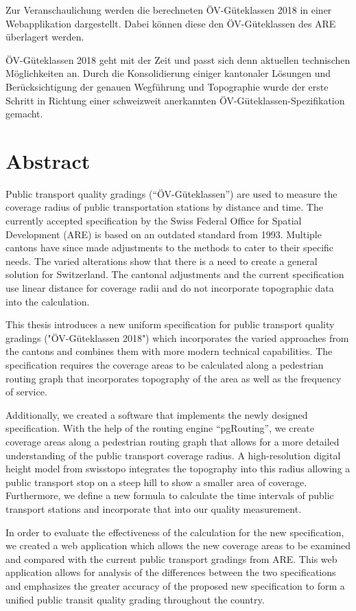 Zur Veranschaulichung werden die berechneten ÖV-Güteklassen 2018 in einer
Webapplikation dargestellt.
Dabei können diese den ÖV-Güteklassen des ARE überlagert werden.

ÖV-Güteklassen 2018 geht mit der Zeit und passt sich denn aktuellen technischen Möglichkeiten an.
Durch die Konsolidierung einiger kantonaler Lösungen und Berücksichtigung der genauen Wegführung und Topographie wurde der erste Schritt in Richtung einer schweizweit anerkannten ÖV-Güteklassen-Spezifikation gemacht.

\cleardoublepage

\chapter*{Abstract}

Public transport quality gradings ("`ÖV-Güteklassen"') are used to measure the coverage radius of public transportation stations by distance and time.
The currently accepted specification by the Swiss Federal Office for Spatial Development (ARE) is based on an outdated standard from 1993.
Multiple cantons have since made adjustments to the methods to cater to their specific needs.
The varied alterations show that there is a need to create a general solution for Switzerland.
The cantonal adjustments and the current specification use linear distance for coverage radii and do not incorporate topographic data into the calculation.

This thesis introduces a new uniform specification for public transport quality gradings ("ÖV-Güteklassen 2018") which incorporates the varied approaches from the cantons and combines them with more modern technical capabilities.
The specification requires the coverage areas to be calculated along a pedestrian routing graph that incorporates topography of the area as well as the frequency of service.

Additionally, we created a software that implements the newly designed specification.
With the help of the routing engine "`pgRouting"', we create coverage areas along a pedestrian routing graph that allows for a more detailed understanding of the public transport coverage radius.
A high-resolution digital height model from swisstopo integrates the topography into this radius allowing a public transport stop on a steep hill to show a smaller area of coverage.
Furthermore, we define a new formula to calculate the time intervals of public transport stations and incorporate that into our quality measurement.

In order to evaluate the effectiveness  of the calculation for the new specification, we created a web application which allows the new coverage areas to be examined and compared with the current public transport gradings from ARE.
This web application allows for analysis of the differences between the two specifications and emphasizes the greater accuracy of the proposed new specification to form a unified public transit quality grading throughout the country.